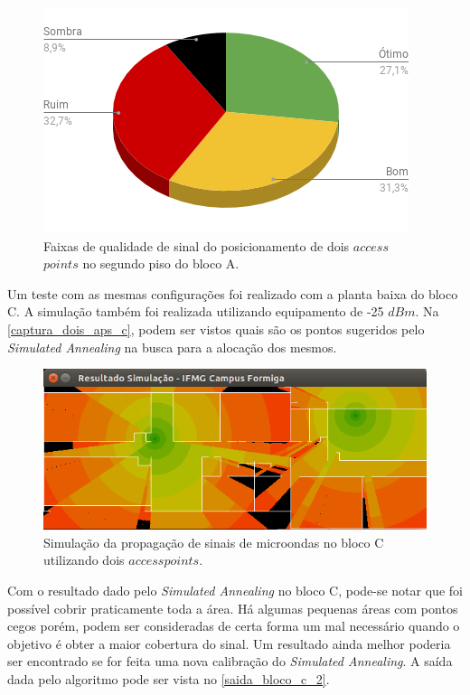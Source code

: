 \documentclass[
	12pt,				%
	twoside,			%
	a4paper,			%
	english,			%
	french,				%
	spanish,			%
	brazil				%
	]{abntex2}
\begin{document}
\begin{figure}[!ht]
    \caption{\label{percent_bloco_a_2} Faixas de qualidade de sinal do posicionamento de dois $access$ $points$ no segundo piso do bloco A. }
    \begin{center}
        \includegraphics[scale=0.7]{imagens/percent-bloco-a-2.png}
    \end{center}
\end{figure}

Um teste com as mesmas configurações foi realizado com a planta baixa do
bloco C. A simulação também foi realizada utilizando equipamento de -25
\(dBm\). Na \autoref{captura_dois_aps_c}, podem ser vistos quais são os
pontos sugeridos pelo \emph{Simulated Annealing} na busca para a
alocação dos mesmos.

\begin{figure}[!ht]
    \caption{\label{captura_dois_aps_c} Simulação da propagação de sinais de microondas no bloco C utilizando dois $access points$.
    }
    \begin{center}
        \includegraphics[scale=0.6]{imagens/captura-2-aps-bloco-c-2.png}
    \end{center}
\end{figure}

Com o resultado dado pelo \emph{Simulated Annealing} no bloco C, pode-se
notar que foi possível cobrir praticamente toda a área. Há algumas
pequenas áreas com pontos cegos porém, podem ser consideradas de certa
forma um mal necessário quando o objetivo é obter a maior cobertura do
sinal. Um resultado ainda melhor poderia ser encontrado se for feita uma
nova calibração do \emph{Simulated Annealing}. A saída dada pelo
algoritmo pode ser vista no \autoref{saida_bloco_c_2}.
\end{document}
